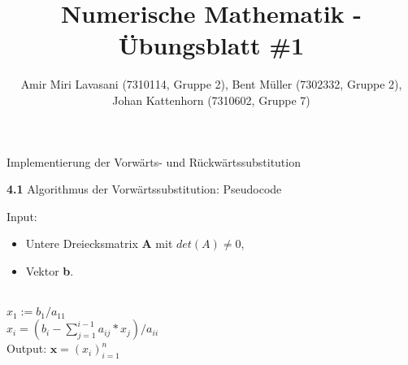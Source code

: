 \documentclass[10pt]{article}
\newenvironment{Aufgabe}[2][Aufgabe]{\begin{trivlist}
\item[\hskip \labelsep {\bfseries #1}\hskip \labelsep {\bfseries #2.}]}{\end{trivlist}}
\begin{document}
 
\title{ \textbf{Numerische Mathematik - Übungsblatt \#1} }

\author{Amir Miri Lavasani (7310114, Gruppe 2), Bent Müller (7302332, Gruppe 2), \\ 
Johan Kattenhorn (7310602, Gruppe 7)} \maketitle

 
\begin{Aufgabe}{4}
	Implementierung der Vorwärts- und Rückwärtssubstitution
\end{Aufgabe}

\textbf{4.1} Algorithmus der Vorwärtssubstitution: Pseudocode \\

\begin{algorithmic}
	\State Input: 
		\begin{itemize}
			\item Untere Dreiecksmatrix \textbf{A} mit $det(A) \neq 0$,
			\item Vektor \textbf{b}. 
		\end{itemize} \\
	\State $x_1 := b_1/a_{11}$ \\
		\State $x_i = \left(b_i-\sum_{j=1}^{i-1}a_{ij}*x_j\right)/a_{ii}$ 
	\EndFor \\

	\State Output: $\textbf{x} = (x_i)_{i=1}^{n}$

\end{algorithmic}
\end{document}
